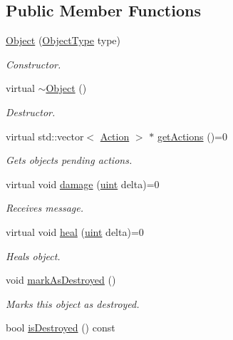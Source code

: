 \subsection*{Public Member Functions}
\begin{DoxyCompactItemize}
\item 
\hyperlink{classObject_a07e8b69a7746aa44c1e7784a08583729}{Object} (\hyperlink{BasicTypes_8h_a842c5e2e69277690b064bf363c017980}{Object\-Type} type)
\begin{DoxyCompactList}\small\item\em Constructor. \end{DoxyCompactList}\item 
virtual \hyperlink{classObject_ae8f5483f459e46687bd01e6f9977afd3}{$\sim$\-Object} ()
\begin{DoxyCompactList}\small\item\em Destructor. \end{DoxyCompactList}\item 
virtual std\-::vector$<$ \hyperlink{classAction}{Action} $>$ $\ast$ \hyperlink{classObject_addf0658ee2f8da579d10a6682dc097d7}{get\-Actions} ()=0
\begin{DoxyCompactList}\small\item\em Gets objects pending actions. \end{DoxyCompactList}\item 
virtual void \hyperlink{classObject_a816838bab5c67fce2cead6cb9122ad47}{damage} (\hyperlink{BasicTypes_8h_a91ad9478d81a7aaf2593e8d9c3d06a14}{uint} delta)=0
\begin{DoxyCompactList}\small\item\em Receives message. \end{DoxyCompactList}\item 
virtual void \hyperlink{classObject_af7f49cb3f3c3bd9cfdbc42beecbbe5bc}{heal} (\hyperlink{BasicTypes_8h_a91ad9478d81a7aaf2593e8d9c3d06a14}{uint} delta)=0
\begin{DoxyCompactList}\small\item\em Heals object. \end{DoxyCompactList}\item 
void \hyperlink{classObject_a9df0b8f5aef27057192b874ebd0d361e}{mark\-As\-Destroyed} ()
\begin{DoxyCompactList}\small\item\em Marks this object as destroyed. \end{DoxyCompactList}\item 
bool \hyperlink{classObject_a1e1a162b817f0c134836cca3a473e295}{is\-Destroyed} () const 

\end{DoxyCompactItemize}
